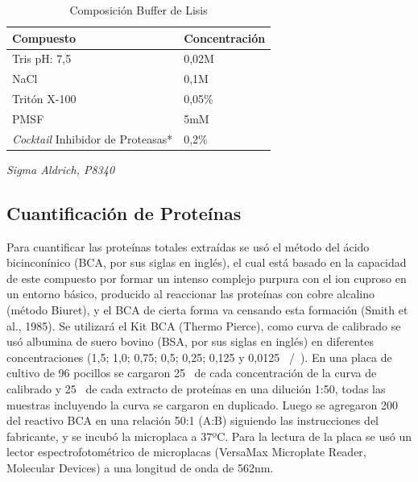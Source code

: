 \documentclass[12pt,a4paper,oneside]{scrbook}
\begin{document}
\begin{table}[h!]
\sffamily
  \begin{center}
    \begin{threeparttable}
      \caption{Composición Buffer de Lisis}\label{tablabufferlisis}
      \begin{tabularx}{10cm}{X l}
    \toprule
    \textbf{Compuesto} & \textbf{Concentración} \\
    \midrule
    Tris pH: 7,5 & 0,02M \\
    NaCl & 0,1M \\
    Tritón X-100 & 0,05\% \\
    PMSF & 5mM \\
    \emph{Cocktail} Inhibidor de Proteasas* & 0,2\% \\
\bottomrule
\end{tabularx}
\begin{tablenotes}
  \item *\emph{Sigma Aldrich, P8340}
\end{tablenotes}
\end{threeparttable}
\end{center}
\end{table}

\subsection{Cuantificación de Proteínas}

Para cuantificar las proteínas totales extraídas se usó el método del
ácido bicinconínico (BCA, por sus siglas en inglés), el cual está basado
en la capacidad de este compuesto por formar un intenso complejo purpura
con el ion cuproso en un entorno básico, producido al reaccionar las
proteínas con cobre alcalino (método Biuret), y el BCA de cierta forma
va censando esta formación (Smith et al., 1985). Se utilizará el Kit BCA
(Thermo Pierce), como curva de calibrado se usó albumina de suero bovino
(BSA, por sus siglas en inglés) en diferentes concentraciones (1,5; 1,0;
0,75; 0,5; 0,25; 0,125 y 0,0125 \si{\micro\gramo}/\si{\micro\litro}). En
una placa de cultivo de 96 pocillos se cargaron 25\si{\micro\litro} de
cada concentración de la curva de calibrado y 25\si{\micro\litro} de
cada extracto de proteínas en una dilución 1:50, todas las muestras
incluyendo la curva se cargaron en duplicado. Luego se agregaron 200
\si{\micro\litro} del reactivo BCA en una relación 50:1 (A:B) siguiendo
las instrucciones del fabricante, y se incubó la microplaca a 37ºC. Para
la lectura de la placa se usó un lector espectrofotométrico de
microplacas (VersaMax Microplate Reader, Molecular Devices) a una
longitud de onda de 562nm.
\end{document}

